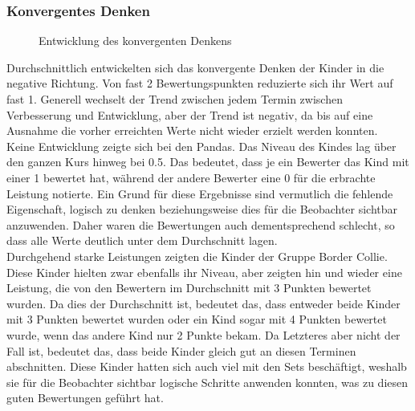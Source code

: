 \subsubsection{Konvergentes Denken}
\begin{figure}[H]
	\centering
	\caption{Entwicklung des konvergenten Denkens}
\end{figure}	
Durchschnittlich entwickelten sich das konvergente Denken der Kinder in die negative Richtung. Von fast 2 Bewertungspunkten reduzierte sich ihr Wert auf fast 1. Generell wechselt der Trend zwischen jedem Termin zwischen Verbesserung und Entwicklung, aber der Trend ist negativ, da bis auf eine Ausnahme die vorher erreichten Werte nicht wieder erzielt werden konnten.\\
Keine Entwicklung zeigte sich bei den Pandas. Das Niveau des Kindes lag über den ganzen Kurs hinweg bei 0.5. Das bedeutet, dass je ein Bewerter das Kind mit einer 1 bewertet hat, während der andere Bewerter eine 0 für die erbrachte Leistung notierte. Ein Grund für diese Ergebnisse sind vermutlich die fehlende Eigenschaft, logisch zu denken beziehungsweise dies für die Beobachter sichtbar anzuwenden. Daher waren die Bewertungen auch dementsprechend schlecht, so dass alle Werte deutlich unter dem Durchschnitt lagen.\\
Durchgehend starke Leistungen zeigten die Kinder der Gruppe Border Collie. Diese Kinder hielten zwar ebenfalls ihr Niveau, aber zeigten hin und wieder eine Leistung, die von den Bewertern im Durchschnitt mit 3 Punkten bewertet wurden. Da dies der Durchschnitt ist, bedeutet das, dass entweder beide Kinder mit 3 Punkten bewertet wurden oder ein Kind sogar mit 4 Punkten bewertet wurde, wenn das andere Kind nur 2 Punkte bekam. Da Letzteres aber nicht der Fall ist, bedeutet das, dass beide Kinder gleich gut an diesen Terminen abschnitten. Diese Kinder hatten sich auch viel mit den Sets beschäftigt, weshalb sie für die Beobachter sichtbar logische Schritte anwenden konnten, was zu diesen guten Bewertungen geführt hat.\\
